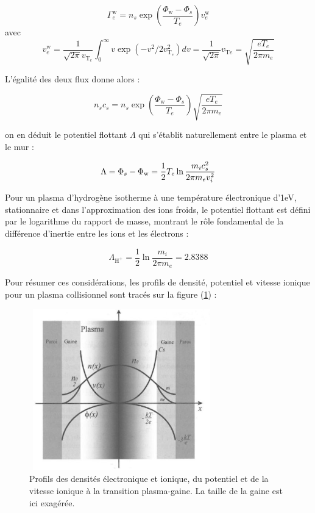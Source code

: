 \begin{refsection}
\begin{equation}
\Gamma_e^\text{w}=n_s\exp\left(\frac{\Phi_\text{w}-\Phi_s}{T_e}\right)v_{e}^\text{w}
\end{equation}
avec 
\begin{equation}
	v_{e}^\text{w}=\frac{1}{\sqrt{2\pi}v_{\text{T}_e}}\int_0^\infty
	v\exp\left(-v^2/2v_{\text{T}_e}^2\right)dv=\frac{1}{\sqrt{2\pi}}v_{\text{T}e}=
	\sqrt{\frac{eT_{e}}{2\pi m_{e}}}
\end{equation}

L'égalité des deux flux donne alors :

\begin{equation}
n_sc_s=n_s\exp\left(\frac{\Phi_\text{w}-\Phi_s}{T_e}\right)\sqrt{\frac{eT_{e}}{2\pi
m_{e}}}
\end{equation}

on en déduit le potentiel flottant $\Lambda$ qui s'établit
naturellement entre le plasma et le mur :

\begin{equation}
	\Lambda=\Phi_{s}-\Phi_\text{w}=\frac{1}{2}T_{e}\ln{\frac{m_{i}c_{s}^2}{2\pi
	m_{e}v_{i}^{{2}}}}
	\end{equation}

Pour un plasma d'hydrogène isotherme à une température électronique
d'1eV, stationnaire et dans l'approximation des ions froids, le potentiel
flottant est défini par le logarithme du rapport de masse, montrant le rôle
fondamental de la différence d'inertie entre les ions et les électrons :

\begin{equation}
	\Lambda_{\text{H}^+}=\frac{1}{2}\ln{\frac{m_{i}}{2\pi
	m_{e}}}=2.8388
	\end{equation}

Pour résumer ces considérations, les profils de densité,
potentiel et vitesse ionique pour un plasma collisionnel sont tracés sur la
figure (\ref{1-profilesgaine}) :
	
\begin{figure}[htbp]
\centering
\includegraphics[height=70mm,width=80mm]{figures/1-sheathprofiles.jpg}{\caption{Profils
des densités électronique et ionique,
du potentiel et de la vitesse ionique à
la transition plasma-gaine\parencite{Rax}. La taille
de la gaine est ici exagérée.}\label{1-profilesgaine}}
\end{figure}


\end{refsection}
